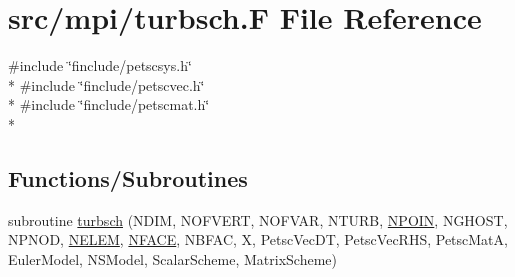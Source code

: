 \hypertarget{mpi_2turbsch_8_f}{\section{src/mpi/turbsch.F File Reference}
\label{mpi_2turbsch_8_f}
}
{\ttfamily \#include \char`\"{}finclude/petscsys.\-h\char`\"{}}\\*
{\ttfamily \#include \char`\"{}finclude/petscvec.\-h\char`\"{}}\\*
{\ttfamily \#include \char`\"{}finclude/petscmat.\-h\char`\"{}}\\*
\subsection*{Functions/\-Subroutines}
\begin{DoxyCompactItemize}
\item 
subroutine \hyperlink{mpi_2turbsch_8_f_a27a8ba455a41d3ab34390fdecf755152}{turbsch} (N\-D\-I\-M, N\-O\-F\-V\-E\-R\-T, N\-O\-F\-V\-A\-R, N\-T\-U\-R\-B, \hyperlink{mesh_8com_ae28c1572321efcd8715b974d87d20c58}{N\-P\-O\-I\-N}, N\-G\-H\-O\-S\-T, N\-P\-N\-O\-D, \hyperlink{mesh_8com_aee5e75b79d0e815c0603cfbccc618957}{N\-E\-L\-E\-M}, \hyperlink{mesh_8com_a78142d59d4cbb9fedbede16187658dd3}{N\-F\-A\-C\-E}, N\-B\-F\-A\-C, X, Petsc\-Vec\-D\-T, Petsc\-Vec\-R\-H\-S, Petsc\-Mat\-A, Euler\-Model, N\-S\-Model, Scalar\-Scheme, Matrix\-Scheme)
\end{DoxyCompactItemize}


